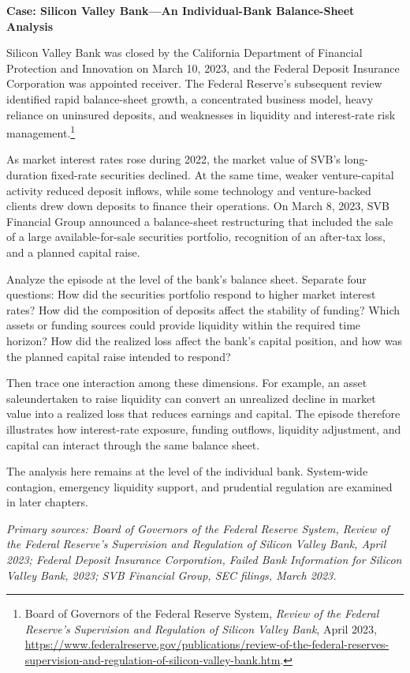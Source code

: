 \textbf{Case: Silicon Valley Bank---An Individual-Bank Balance-Sheet Analysis}

Silicon Valley Bank was closed by the California Department of Financial
Protection and Innovation on March 10, 2023, and the Federal Deposit Insurance
Corporation was appointed receiver. The Federal Reserve's subsequent review
identified rapid balance-sheet growth, a concentrated business model, heavy
reliance on uninsured deposits, and weaknesses in liquidity and interest-rate
risk management.\footnote{Board of Governors of the Federal Reserve System, \emph{Review of the Federal Reserve's Supervision and Regulation of Silicon Valley Bank}, April 2023, \url{https://www.federalreserve.gov/publications/review-of-the-federal-reserves-supervision-and-regulation-of-silicon-valley-bank.htm}. }

As market interest rates rose during 2022, the market value of SVB's
long-duration fixed-rate securities declined. At the same time, weaker
venture-capital activity reduced deposit inflows, while some technology and
venture-backed clients drew down deposits to finance their operations. On
March 8, 2023, SVB Financial Group announced a balance-sheet restructuring
that included the sale of a large available-for-sale securities portfolio,
recognition of an after-tax loss, and a planned capital raise.

Analyze the episode at the level of the bank's balance sheet. Separate four
questions: How did the securities portfolio respond to higher market interest
rates? How did the composition of deposits affect the stability of funding?
Which assets or funding sources could provide liquidity within the required
time horizon? How did the realized loss affect the bank's capital position,
and how was the planned capital raise intended to respond?

Then trace one interaction among these dimensions. For example, an asset saleundertaken to raise liquidity can convert an unrealized decline in market value
into a realized loss that reduces earnings and capital. The episode therefore
illustrates how interest-rate exposure, funding outflows, liquidity adjustment,
and capital can interact through the same balance sheet.

The analysis here remains at the level of the individual bank. System-wide
contagion, emergency liquidity support, and prudential regulation are examined
in later chapters.

\emph{Primary sources: Board of Governors of the Federal Reserve System,
Review of the Federal Reserve's Supervision and Regulation of Silicon Valley
Bank, April 2023; Federal Deposit Insurance Corporation, Failed Bank Information
for Silicon Valley Bank, 2023; SVB Financial Group, SEC filings, March 2023.}

